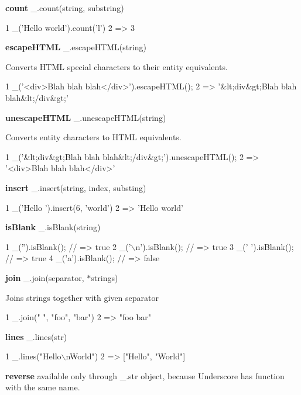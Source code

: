 {\bfseries count} \+\_\+.\+count(string, substring)


\begin{DoxyCode}
1 \_('Hello world').count('l')
2 => 3
\end{DoxyCode}


{\bfseries escape\+H\+T\+M\+L} \+\_\+.\+escape\+H\+T\+M\+L(string)

Converts H\+T\+M\+L special characters to their entity equivalents.


\begin{DoxyCode}
1 \_('<div>Blah blah blah</div>').escapeHTML();
2 => '&lt;div&gt;Blah blah blah&lt;/div&gt;'
\end{DoxyCode}


{\bfseries unescape\+H\+T\+M\+L} \+\_\+.\+unescape\+H\+T\+M\+L(string)

Converts entity characters to H\+T\+M\+L equivalents.


\begin{DoxyCode}
1 \_('&lt;div&gt;Blah blah blah&lt;/div&gt;').unescapeHTML();
2 => '<div>Blah blah blah</div>'
\end{DoxyCode}


{\bfseries insert} \+\_\+.\+insert(string, index, substing)


\begin{DoxyCode}
1 \_('Hello ').insert(6, 'world')
2 => 'Hello world'
\end{DoxyCode}


{\bfseries is\+Blank} \+\_\+.\+is\+Blank(string)


\begin{DoxyCode}
1 \_('').isBlank(); // => true
2 \_('\(\backslash\)n').isBlank(); // => true
3 \_(' ').isBlank(); // => true
4 \_('a').isBlank(); // => false
\end{DoxyCode}


{\bfseries join} \+\_\+.\+join(separator, $\ast$strings)

Joins strings together with given separator


\begin{DoxyCode}
1 \_.join(" ", "foo", "bar")
2 => "foo bar"
\end{DoxyCode}


{\bfseries lines} \+\_\+.\+lines(str)


\begin{DoxyCode}
1 \_.lines("Hello\(\backslash\)nWorld")
2 => ["Hello", "World"]
\end{DoxyCode}


{\bfseries reverse} available only through \+\_\+.\+str object, because Underscore has function with the same name.

